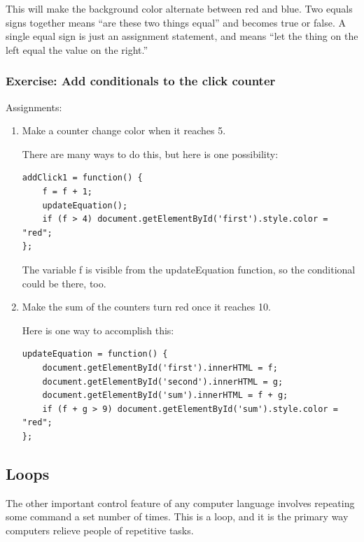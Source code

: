 \documentclass[11pt]{article}
\begin{document}
This will make the background color alternate between red and blue.
Two equals signs together means ``are these two things equal'' and
becomes true or false.  A single equal sign is just an assignment
statement, and means ``let the thing on the left equal the value on
the right.''



\subsubsection{Exercise: Add conditionals to the click counter}

Assignments:

\begin{enumerate}

\item Make a counter change color when it reaches 5.

There are many ways to do this, but here is one possibility:

\begin{verbatim}
addClick1 = function() {
    f = f + 1;
    updateEquation();
    if (f > 4) document.getElementById('first').style.color = "red";
};
\end{verbatim}

The variable f is visible from the updateEquation function, so the
conditional could be there, too.

\item Make the sum of the counters turn red once it reaches 10.

Here is one way to accomplish this:

\begin{verbatim}
updateEquation = function() {
    document.getElementById('first').innerHTML = f;
    document.getElementById('second').innerHTML = g;
    document.getElementById('sum').innerHTML = f + g;
    if (f + g > 9) document.getElementById('sum').style.color = "red";
};
\end{verbatim}

\end{enumerate}


\subsection{Loops}


The other important control feature of any computer language involves
repeating some command a set number of times.  This is a loop, and it
is the primary way computers relieve people of repetitive tasks.
\end{document}
